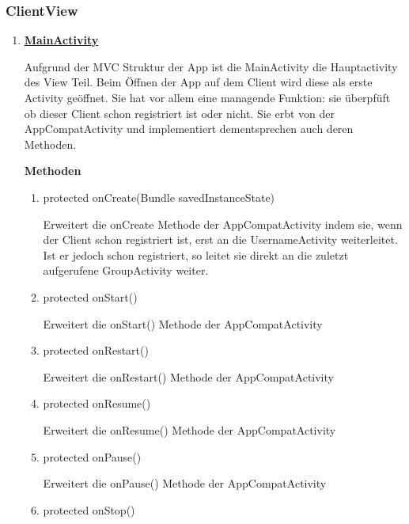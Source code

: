\subsubsection{ClientView}
\begin{enumerate}
	\item \textbf{\underline{MainActivity}}
	
	Aufgrund der MVC Struktur der App ist die MainActivity die Hauptactivity des View Teil. Beim Öffnen der App auf dem Client wird diese als erste Activity geöffnet. Sie hat vor allem eine managende Funktion: sie überpfüft ob dieser Client schon registriert ist oder nicht. Sie erbt von der AppCompatActivity und implementiert dementsprechen auch deren Methoden.
	
	\textbf{Methoden}
	\begin{enumerate}
		\item protected onCreate(Bundle savedInstanceState) 
		
		Erweitert die onCreate Methode der AppCompatActivity indem sie, wenn der Client schon registriert ist, erst an die UsernameActivity weiterleitet. Ist er jedoch schon registriert, so leitet sie direkt an die zuletzt aufgerufene GroupActivity weiter.
		
		\item protected onStart()
		
		Erweitert die onStart() Methode der AppCompatActivity %
		
		\item protected onRestart()
		
		Erweitert die onRestart() Methode der AppCompatActivity %
		
		\item protected onResume()

		Erweitert die onResume() Methode der AppCompatActivity %
		
		\item protected onPause()

		Erweitert die onPause() Methode der AppCompatActivity %
		
		\item protected onStop()


\end{enumerate}
\end{enumerate}
